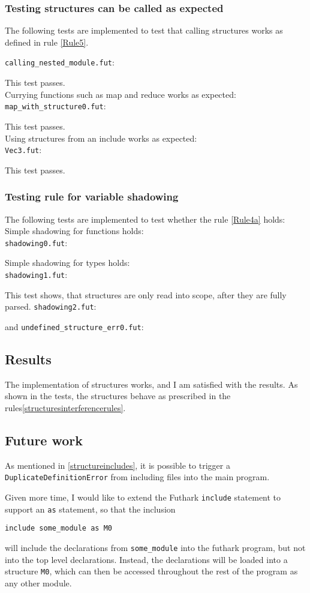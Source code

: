 \subsubsection{Testing structures can be called as expected}
The following tests are implemented to test that calling structures works as
defined in rule \ref{Rule5}.

\texttt{calling\_nested\_module.fut}:

This test passes.
\\
Currying functions such as map and reduce works as expected:\\
\texttt{map\_with\_structure0.fut}:

This test passes.
\\
Using structures from an include works as expected:\\
\texttt{Vec3.fut}:


This test passes.
\subsubsection{Testing rule for variable shadowing}
The following tests are implemented to test whether the rule \ref{Rule4a} holds:
Simple shadowing for functions holds:\\
\texttt{shadowing0.fut}:

Simple shadowing for types holds:\\
\texttt{shadowing1.fut}:

This test shows, that structures are only read into scope, after they are fully parsed.
\texttt{shadowing2.fut}:

and
\texttt{undefined\_structure\_err0.fut}:


\subsection{Results}
\label{subsec:structuresresults}
The implementation of structures works, and I am satisfied with the results. As
shown in the tests, the structures behave as prescribed in the rules\ref{structuresinterferencerules}.
\subsection{Future work}
\label{subsec:structuresfuturework}
As mentioned in \ref{structureincludes}, it is possible to trigger a
\texttt{DuplicateDefinitionError} from including files into the main program.

Given more time, I would like to extend the Futhark \texttt{include} statement
to support an \texttt{as} statement, so that the inclusion

\texttt{include some\_module as M0}

will include the declarations from \texttt{some\_module} into the futhark program, but not
into the top level declarations. Instead, the declarations will be loaded into a
structure \texttt{M0}, which can then be accessed throughout the rest of the program as
any other module.